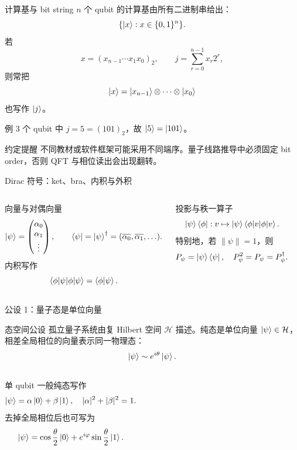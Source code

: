 \documentclass[aspectratio=169,10pt]{ctexbeamer}
\begin{document}
\begin{frame}{计算基与 bit string}
$n$ 个 qubit 的计算基由所有二进制串给出：
\[
\{\ket{x}:x\in\{0,1\}^n\}.
\]
若
\[
x=(x_{n-1}\cdots x_1x_0)_2,\qquad j=\sum_{r=0}^{n-1}x_r2^r,
\]
则常把
\[
\ket{x}=\ket{x_{n-1}}\otimes\cdots\otimes\ket{x_0}
\]
也写作 $\ket{j}$。
\begin{exbox}{例}
$3$ 个 qubit 中 $j=5=(101)_2$，故 $\ket{5}=\ket{101}$。
\end{exbox}
\begin{warnbox}{约定提醒}
不同教材或软件框架可能采用不同端序。量子线路推导中必须固定 bit order，否则 QFT 与相位读出会出现翻转。
\end{warnbox}
\end{frame}

\begin{frame}{Dirac 符号：ket、bra、内积与外积}
\begin{columns}[T,totalwidth=\textwidth]
\begin{keybox}{向量与对偶向量}
\[
\ket{\psi}=\begin{pmatrix}\alpha_0\\ \alpha_1\\ \vdots\end{pmatrix},
\qquad
\bra{\psi}=\ket{\psi}^{\dagger}=(\overline{\alpha_0},\overline{\alpha_1},\ldots).
\]
内积写作
\[
\braket{\phi|\psi}=\bra{\phi}\ket{\psi}.
\]
\end{keybox}
\begin{keybox}{投影与秩一算子}
\[
\ket{\psi}\bra{\phi}: v\mapsto \ket{\psi}\braket{\phi|v}.
\]
特别地，若 $\|\psi\|=1$，则
\[
P_{\psi}=\ket{\psi}\bra{\psi},\quad P_{\psi}^2=P_{\psi}=P_{\psi}^{\dagger}.
\]
\end{keybox}
\end{columns}
\end{frame}

\begin{frame}{公设 1：量子态是单位向量}
\begin{keybox}{态空间公设}
孤立量子系统由复 Hilbert 空间 $\mathcal H$ 描述。纯态是单位向量 $\ket{\psi}\in\mathcal H$，相差全局相位的向量表示同一物理态：
\[
\ket{\psi}\sim e^{i\theta}\ket{\psi}.
\]
\end{keybox}
\begin{columns}[T,totalwidth=\textwidth]
单 qubit 一般纯态写作
\[
\ket{\psi}=\alpha\ket{0}+\beta\ket{1},\quad |\alpha|^2+|\beta|^2=1.
\]
去掉全局相位后也可写为
\[
\ket{\psi}=\cos\frac\theta2\ket{0}+e^{i\varphi}\sin\frac\theta2\ket{1}.
\]
\end{columns}
\end{frame}
\end{document}
